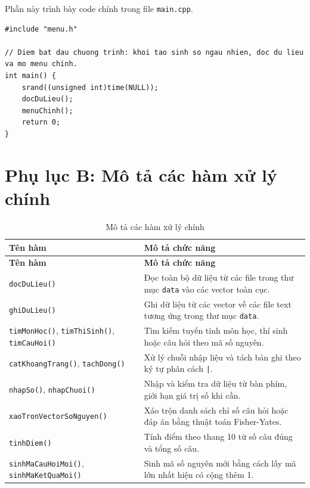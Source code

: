 \documentclass[12pt,a4paper]{report}
\newcommand{\codecell}[1]{\texttt{#1}}
\begin{document}
Phần này trình bày code chính trong file \texttt{main.cpp}.

\begin{lstlisting}[style=cppstyle, caption={Code hàm main hiện tại}]
#include "menu.h"

// Diem bat dau chuong trinh: khoi tao sinh so ngau nhien, doc du lieu va mo menu chinh.
int main() {
    srand((unsigned int)time(NULL));
    docDuLieu();
    menuChinh();
    return 0;
}
\end{lstlisting}

\section{Phụ lục B: Mô tả các hàm xử lý chính}

\begin{longtable}{|>{\Centering\arraybackslash}p{}|>{\Centering\arraybackslash}p{}|}
\caption{Mô tả các hàm xử lý chính}\label{tab:ham-xu-ly}\\
\hline
\textbf{Tên hàm} & \textbf{Mô tả chức năng} \\
\hline
\endfirsthead
\hline
\textbf{Tên hàm} & \textbf{Mô tả chức năng} \\
\hline
\endhead
\codecell{docDuLieu()} & Đọc toàn bộ dữ liệu từ các file trong thư mục \codecell{data} vào các vector toàn cục. \\
\hline
\codecell{ghiDuLieu()} & Ghi dữ liệu từ các vector về các file text tương ứng trong thư mục \codecell{data}. \\
\hline
\codecell{timMonHoc()}, \codecell{timThiSinh()}, \codecell{timCauHoi()} & Tìm kiếm tuyến tính môn học, thí sinh hoặc câu hỏi theo mã số nguyên. \\
\hline
\codecell{catKhoangTrang()}, \codecell{tachDong()} & Xử lý chuỗi nhập liệu và tách bản ghi theo ký tự phân cách \codecell{|}. \\
\hline
\codecell{nhapSo()}, \codecell{nhapChuoi()} & Nhập và kiểm tra dữ liệu từ bàn phím, giới hạn giá trị số khi cần. \\
\hline
\codecell{xaoTronVectorSoNguyen()} & Xáo trộn danh sách chỉ số câu hỏi hoặc đáp án bằng thuật toán Fisher-Yates. \\
\hline
\codecell{tinhDiem()} & Tính điểm theo thang 10 từ số câu đúng và tổng số câu. \\
\hline
\codecell{sinhMaCauHoiMoi()}, \codecell{sinhMaKetQuaMoi()} & Sinh mã số nguyên mới bằng cách lấy mã lớn nhất hiện có cộng thêm 1. \\

\end{longtable}
\end{document}
